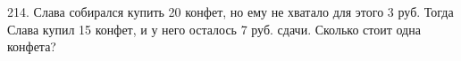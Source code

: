 214. Слава собирался купить 20 конфет, но ему не хватало для этого 3 руб. Тогда Слава купил 15 конфет, и у него осталось 7 руб. сдачи. Сколько стоит одна конфета?\\
